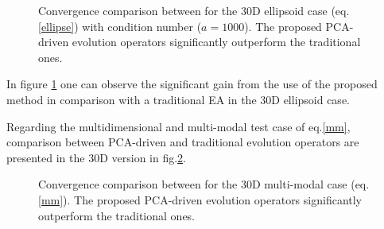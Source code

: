 \begin{figure}[h!]
\begin{minipage}[b]{1\linewidth}
 \centering
\end{minipage}
\caption{Convergence comparison between for the 30D ellipsoid case (eq. \ref{ellipse}) with condition number ($a = 1000$). The proposed PCA-driven evolution operators significantly outperform the traditional ones.} 
\label{Ellt3}
\end{figure}

In figure \ref{Ellt3} one can observe the significant gain from the use of the proposed method in comparison with a traditional EA in the 30D ellipsoid case.

Regarding the multidimensional and multi-modal test case of eq.\ref{mm}, comparison between PCA-driven and traditional evolution operators are presented in the 30D version in fig.\ref{mmt3}.  

\begin{figure}[h!]
\begin{minipage}[b]{1\linewidth}
 \centering
\end{minipage}
\caption{Convergence comparison between for the 30D multi-modal case (eq. \ref{mm}). The proposed PCA-driven evolution operators significantly outperform the traditional ones.} 
\label{mmt3}
\end{figure}

